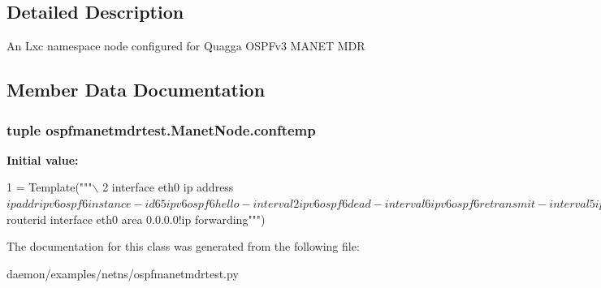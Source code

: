 \subsection{Detailed Description}
\begin{DoxyVerb}An Lxc namespace node configured for Quagga OSPFv3 MANET MDR
\end{DoxyVerb}
 

\subsection{Member Data Documentation}
\hypertarget{classospfmanetmdrtest_1_1_manet_node_af3fd22631b3d8ead032634c249c79e37}{
\subsubsection[{conftemp}]{\setlength{\rightskip}{0pt plus 5cm}tuple ospfmanetmdrtest.\+Manet\+Node.\+conftemp\hspace{0.3cm}{\ttfamily [static]}}}\label{classospfmanetmdrtest_1_1_manet_node_af3fd22631b3d8ead032634c249c79e37}
{\bfseries Initial value\+:}
\begin{DoxyCode}
1 = Template(\textcolor{stringliteral}{"""\(\backslash\)}
2 \textcolor{stringliteral}{interface eth0  ip address $ipaddr  ipv6 ospf6 instance-id 65  ipv6 ospf6 hello-interval 2  ipv6 ospf6
       dead-interval 6  ipv6 ospf6 retransmit-interval 5  ipv6 ospf6 network manet-designated-router  ipv6 ospf6
       diffhellos  ipv6 ospf6 adjacencyconnectivity biconnected  ipv6 ospf6 lsafullness mincostlsa!router ospf6 
       router-id $routerid  interface eth0 area 0.0.0.0!ip forwarding"""})
\end{DoxyCode}


The documentation for this class was generated from the following file\+:\begin{DoxyCompactItemize}
\item 
daemon/examples/netns/ospfmanetmdrtest.\+py\end{DoxyCompactItemize}
